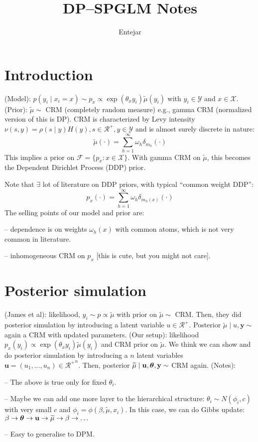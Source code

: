 \documentclass{article}[12pt]
\title{DP--SPGLM Notes}
\author{Entejar}
\date{}
\renewcommand{\th}{\theta}
\newcommand{\tmu}{\widetilde{\mu}}
\newcommand{\scf}{\mathcal{F}}
\newcommand{\sx}{\mathcal{X}}
\newcommand{\bth}{\mbox{\boldmath $\theta$}}
\begin{document}
\maketitle

\section{Introduction}
(Model): $p(y_i \mid x_i = x) \sim p_x \propto \exp(\th_x y_i)\tmu(y_i)$ with $y_i \in \mathcal{Y}$ and $x \in \mathcal{X}$. 
\vspace{1mm}
\newline (Prior): $\tmu \sim$ CRM (completely random measure) e.g., gamma CRM (normalized version of this is DP). CRM is characterized by Levy intensity $\nu(s, y) = \rho(s \mid y) H(y), s \in \mathcal{R}^+, y \in \mathcal{Y}$ and is almost surely discrete in nature:
$$
\widetilde{\mu}(\cdot)=\sum_{h=1}^{\infty} \omega_h \delta_{m_h}(\cdot)
$$
This implies a prior on $\scf = \{p_x: x \in \sx\}$. With gamma CRM on $\tmu$, this becomes the Dependent Dirichlet Process (DDP) prior.
\vspace{1mm}

\noindent Note that $\exists$ lot of literature on DDP priors, with typical ``common weight DDP'':
\begin{equation}
p_x(\cdot) = \sum_{h=1}^\infty \omega_{h} \delta_{m_h(x)}(\cdot) \label{varyingweightsDDP}
\end{equation}
The selling points of our model and prior are:

-- dependence is on weights $\omega_h(x)$ with common atoms, which is not very common in literature.

-- inhomogeneous CRM on $p_x$ [this is cute, but you might not care].

\section{Posterior simulation}
(James et al): likelihood, $y_i \sim p \propto \tmu$ with prior on $\tmu \sim$ CRM. Then, they did posterior simulation by introducing a latent variable $u \in \mathcal{R}^+$. Posterior $\tmu \mid u, \mathbf{y} \sim$ again a CRM with updated parameters. 
\vspace{2mm}
\newline (Our setup): likelihood $p_x(y_i) \propto \exp(\th_x y_i)\tmu(y_i)$ and CRM prior on $\tmu$. We think we can show and do posterior simulation by introducing a $n$ latent variables $\mathbf{u} = (u_1, \dots, u_n) \in {\mathcal{R}^+}^n$. Then, posterior $\tmu \mid \mathbf{u}, \bth, \mathbf{y} \sim$ CRM again.
\vspace{2mm}
\newline (Notes):

-- The above is true only for fixed $\th_i$.

-- Maybe we can add one more layer to the hierarchical structure: $\theta_i \sim N(\phi_i, c)$ with very small $c$ and $\phi_i = \phi(\beta, \tmu, x_i)$. In this case, we can do Gibbs update: $\beta \to \bth \to \mathbf{u} \to \tmu \to \beta \to \dots$

-- Easy to generalise to DPM.
\end{document}
